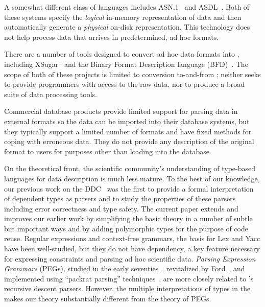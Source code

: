 A somewhat different class of languages includes
\textsc{ASN.1}~\cite{asn} and \textsc{ASDL}~\cite{asdl}.  Both of
these systems specify the {\em logical\/} in-memory representation of
data and then automatically generate a {\em physical\/} on-disk
representation.  This technology does not help process data that
arrives in predetermined, ad hoc formats.

There are a number of tools designed to convert ad hoc
data formats into \xml{}, including
XSugar~\cite{brabrand+:xsugar2005} and the Binary Format Description
language (BFD)~\cite{bfd}. The scope of both of these projects is
limited to conversion to-and-from \xml{}; neither seeks to provide
programmers with access to the raw data, nor to produce a broad suite of
data processing tools.


Commercial database products provide limited support for
parsing data in external formats so the data can be imported into
their database systems, but they typically support a limited number of
formats and have fixed methods for coping with erroneous data.  They do not provide any description of the original format to users for purposes other than loading into the database.

On the theoretical front, the scientific community's understanding of
type-based languages for data description is much less mature.  To the
best of our knowledge, our previous work on the
DDC~\cite{fisher+:next700ddl} was the first to provide a formal
interpretation of dependent types as parsers and to study the
properties of these parsers including error correctness and type
safety.  The current paper extends and improves our earlier work by
simplifying the basic theory in a number of subtle but important ways
and by adding polymorphic types for the purpose of code reuse.
Regular expressions and context-free grammars, the basis for Lex and
Yacc have been well-studied, but they do not have dependency, a key
feature necessary for expressing constraints and parsing ad hoc
scientific data.  {\em Parsing Expression Grammars} (PEGs), studied in
the early seventies~\cite{birman+:parsing}, revitalized 
by Ford~\cite{ford:pegs}, and implemented using ``packrat parsing''
techniques~\cite{ford:packrat,grimm:packrat}, are more closely
related to \padsml{}'s recursive descent parsers. However, the
multiple interpretations of types in the \ddc{} makes our theory
substantially different from the theory of PEGs.

